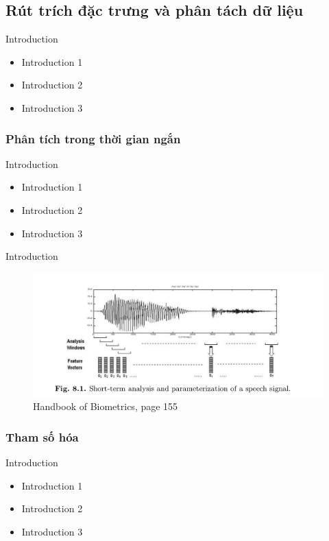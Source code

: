 \documentclass[11pt]{beamer}
\begin{document}
\subsection{Rút trích đặc trưng và phân tách dữ liệu}
\begin{frame}{Introduction}
	\begin{itemize}
		\item Introduction 1
		\item Introduction 2
		\item Introduction 3
	\end{itemize}
\end{frame}
\subsubsection{Phân tích trong thời gian ngắn}
\begin{frame}{Introduction}
	\begin{itemize}
		\item Introduction 1
		\item Introduction 2
		\item Introduction 3
	\end{itemize}
\end{frame}
\begin{frame}{Introduction}
	\begin{figure}[h!]
		\includegraphics[width=0.9\linewidth]{images/figure_8_1.png}
		\caption{Handbook of Biometrics, page 155}
		\label{fig:writing-thesis}
	\end{figure}
\end{frame}

\subsubsection{Tham số hóa}
\begin{frame}{Introduction}
	\begin{itemize}
		\item Introduction 1
		\item Introduction 2
		\item Introduction 3
	\end{itemize}
\end{frame}
\end{document}
